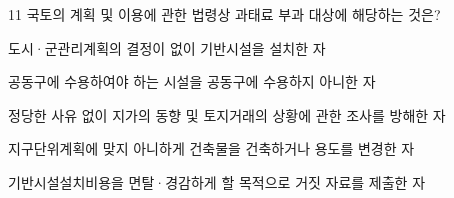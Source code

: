 \begin{question}{11}
국토의 계획 및 이용에 관한 법령상 과태료 부과 대상에 해당하는 것은?
\begin{choices}
  \item 도시·군관리계획의 결정이 없이 기반시설을 설치한 자
  \item 공동구에 수용하여야 하는 시설을 공동구에 수용하지 아니한 자
  \item 정당한 사유 없이 지가의 동향 및 토지거래의 상황에 관한 조사를 방해한 자
  \item 지구단위계획에 맞지 아니하게 건축물을 건축하거나 용도를 변경한 자
  \item 기반시설설치비용을 면탈·경감하게 할 목적으로 거짓 자료를 제출한 자
\end{choices}
\end{question}
